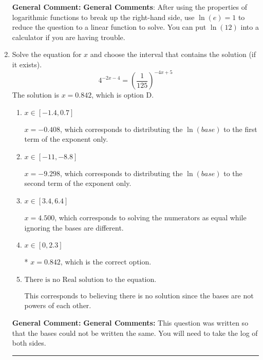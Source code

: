 \documentclass{extbook}[14pt]
\newcommand{\litem}[1]{\item #1

\rule{\textwidth}{0.4pt}}
\begin{document}
\begin{enumerate}
{\textbf{General Comment:} \textbf{General Comments}: After using the properties of logarithmic functions to break up the right-hand side, use $\ln(e) = 1$ to reduce the question to a linear function to solve. You can put $\ln(12)$ into a calculator if you are having trouble.
}
\litem{
Solve the equation for $x$ and choose the interval that contains the solution (if it exists).
\[ 4^{-2x-4} = \left(\frac{1}{125}\right)^{-4x+5} \]The solution is \( x = 0.842 \), which is option D.\begin{enumerate}[label=\Alph*.]
\item \( x \in [-1.4, 0.7] \)

$x = -0.408$, which corresponds to distributing the $\ln(base)$ to the first term of the exponent only.
\item \( x \in [-11, -8.8] \)

$x = -9.298$, which corresponds to distributing the $\ln(base)$ to the second term of the exponent only.
\item \( x \in [3.4, 6.4] \)

$x = 4.500$, which corresponds to solving the numerators as equal while ignoring the bases are different.
\item \( x \in [0, 2.3] \)

* $x = 0.842$, which is the correct option.
\item \( \text{There is no Real solution to the equation.} \)

This corresponds to believing there is no solution since the bases are not powers of each other.
\end{enumerate}

\textbf{General Comment:} \textbf{General Comments:} This question was written so that the bases could not be written the same. You will need to take the log of both sides.
}
\end{enumerate}
\end{document}
